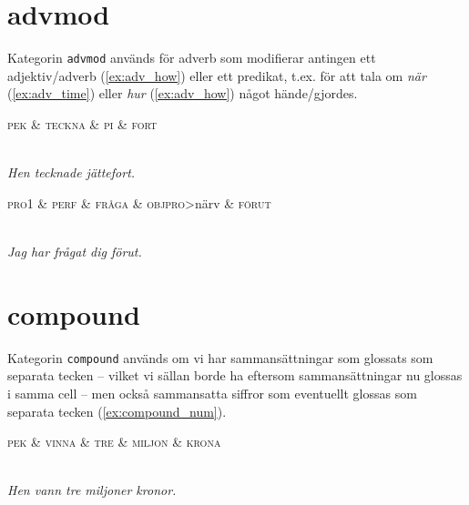 \documentclass[11pt,a4paper]{article}
\begin{document}
\section{advmod}
Kategorin \texttt{advmod} används för adverb som modifierar antingen ett adjektiv/adverb (\ref{ex:adv_how}) eller ett predikat, t.ex. för att tala om \textit{när} (\ref{ex:adv_time}) eller \textit{hur} (\ref{ex:adv_how}) något hände/gjordes.

\begin{example}
\label{ex:adv_how}
\begin{dependency}[theme = simple]
   \begin{deptext}[column sep=1em]
      \textsc{pek} \& \textsc{teckna} \& \textsc{pi} \& \textsc{fort} \\
   \end{deptext}
\end{dependency}
\\
\textit{Hen tecknade jättefort.}
\end{example}

\begin{example}
\label{ex:adv_time}
\begin{dependency}[theme = simple]
   \begin{deptext}[column sep=1em]
      \textsc{pro1} \& \textsc{perf} \& \textsc{fråga} \& \textsc{objpro}{\textgreater}närv \& \textsc{förut} \\
   \end{deptext}
\end{dependency}
\\
\textit{Jag har frågat dig förut.}
\end{example}

\section{compound}
Kategorin \texttt{compound} används om vi har sammansättningar som glossats som separata tecken -- vilket vi sällan borde ha eftersom sammansättningar nu glossas i samma cell -- men också sammansatta siffror som eventuellt glossas som separata tecken (\ref{ex:compound_num}).

\begin{example}
\label{ex:compound_num}
\begin{dependency}[theme = simple]
   \begin{deptext}[column sep=1em]
      \textsc{pek} \& \textsc{vinna} \& \textsc{tre} \& \textsc{miljon} \& \textsc{krona} \\
   \end{deptext}
\end{dependency}
\\
\textit{Hen vann tre miljoner kronor.}
\end{example}
\end{document}

